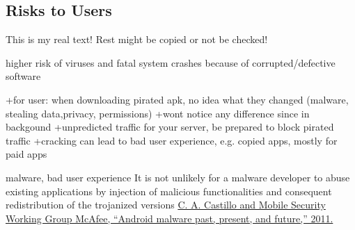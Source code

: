 \subsection{Risks to Users} \label{subsection:foundation-piracy-users}
This is my real text! Rest might be copied or not be checked!

higher risk of viruses and fatal system crashes because of corrupted/defective software

+for user: when downloading pirated apk, no idea what they changed (malware, stealing data,privacy, permissions)\newline
+wont notice any difference since in backgound\newline
+unpredicted traffic for your server, be prepared to block pirated traffic\newline
+cracking can lead to bad user experience, e.g. copied apps, mostly for paid apps\newline

malware, bad user experience\newline
It is not unlikely for a malware developer to abuse existing applications by injection of malicious functionalities and consequent redistribution of the trojanized versions \url{C. A. Castillo and Mobile Security Working Group McAfee, “Android malware past, present, and future,” 2011.}
